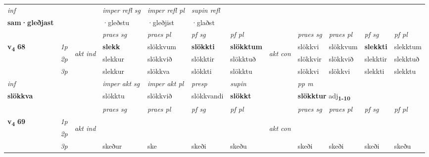 \begin{longtable}[l]{X>{\footnotesize\itshape}llXXXXlXXXX}
   {\textit{inf}} & &   & \textit{imper refl sg} & \textit{imper refl pl}   & \textit{supin refl}  \\*
  {\textbf{sam\allowbreak ·gleðjast}} & &   & ·gleðstu & ·gleðjist   & ·glaðst  \\*

\midrule

 & &   & \textit{praes sg}  & \textit{praes pl}    & \textit{ pf sg} & \textit{pf pl} & & \textit{praes sg}  & \textit{praes pl}    & \textit{pf sg} & \textit{pf pl }  \\ \cmidrule{4-7} \cmidrule{9-12}
 \multirow{2}{*}{{{\textbf{v{\textsubscript{4}}} \Large{\textbf{68}}}}}  & 1p & \multirow{3}{*}{\begin{turn}{90}\textit{akt ind}\end{turn}} & \textbf{slekk} & slökkvum & \textbf{slökkti} & \textbf{slökktum} & \multirow{3}{*}{\begin{turn}{90}\textit{akt con}\end{turn}} &slökkvi & slökkvum & \textbf{slekkti} & slekktum\\*
 & 2p &  &  slekkur  & slökkvið & slökktir & slökktuð & & slökkvir & slökkvið & slekktir & slekktuð \\*
 & 3p &  & slekkur & slökkva & slökkti & slökktu & & slökkvi & slökkvi& slekkti & slekktu \\*
\cmidrule{4-7} \cmidrule{9-12}

   {\textit{inf}} & &  & \textit{imper akt sg} & \textit{imper akt pl}   & \textit{presp} & \textit{supin}  && \textit{pp m} \\*
  {\textbf{slökkva}} & && slökktu  & slökkvið   & slökkvandi &  \textbf{slökkt}  && \multicolumn{2}{l}{\textbf{slökktur} adj\textbf{\textsubscript{1-10}}} \\*

\midrule

 & &   & \textit{praes sg}  & \textit{praes pl}    & \textit{ pf sg} & \textit{pf pl} & & \textit{praes sg}  & \textit{praes pl}    & \textit{pf sg} & \textit{pf pl }  \\ \cmidrule{4-7} \cmidrule{9-12}
 \multirow{2}{*}{{{\textbf{v{\textsubscript{4}}} \Large{\textbf{69}}}}}  & 1p & \multirow{3}{*}{\begin{turn}{90}\textit{akt ind}\end{turn}} & \textbf{} &  & \textbf{} & \textbf{} & \multirow{3}{*}{\begin{turn}{90}\textit{akt con}\end{turn}} & &  & \textbf{} & \\*
 & 2p &  &    &  &  &  & &  &  &  &  \\*
 & 3p &  & skeður & ske & skeði & skeðu & & skeði & skeði& skeði & skeðu \\*
\cmidrule{4-7} \cmidrule{9-12}


\end{longtable}
